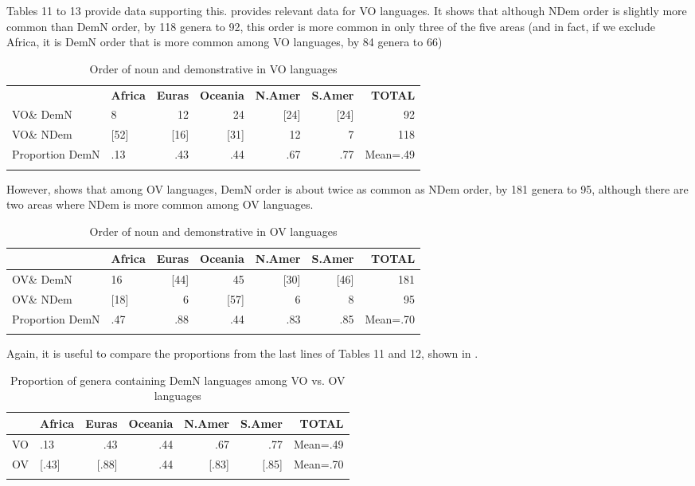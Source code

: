 \documentclass[output=paper]{langsci/langscibook}
\begin{document}
Tables 11 to 13 provide data supporting this.  provides relevant data for VO languages. It shows that although NDem order is slightly more common than DemN order, by 118 genera to 92, this order is more common in only three of the five areas (and in fact, if we exclude Africa, it is DemN order that is more common among VO languages, by 84 genera to 66)

\begin{table}
\begin{tabularx}{\textwidth}{Xlrrrrr} 
& \bfseries Africa & \bfseries Euras & \bfseries Oceania & \bfseries N.Amer & \bfseries S.Amer & \bfseries TOTAL\\
\lsptoprule
VO\& DemN & 8 & 12 & 24 & [24] & [24] & 92\\
VO\& NDem & [52] & [16] & [31] & 12 & 7 & 118\\
Proportion DemN & .13 & .43 & .44 & .67 & .77 & Mean=.49\\
\lspbottomrule
\end{tabularx}
\caption{\label{tab:dryer:11}Order of noun and demonstrative in VO languages}
\end{table}


However,  shows that among OV languages, DemN order is about twice as common as NDem order, by 181 genera to 95, although there are two areas where NDem is more common among OV languages.

\begin{table}
\begin{tabularx}{\textwidth}{Xlrrrrr}
\lsptoprule
& \bfseries Africa & \bfseries Euras & \bfseries Oceania & \bfseries N.Amer & \bfseries S.Amer & \bfseries TOTAL\\
\midrule
OV\& DemN & 16 & [44] & 45 & [30] & [46] & 181\\
OV\& NDem & [18] & 6 & [57] & 6 & 8 & 95\\
Proportion DemN & .47 & .88 & .44 & .83 & .85 & Mean=.70\\
\lspbottomrule
\end{tabularx}
\caption{\label{tab:dryer:12}Order of noun and demonstrative in OV languages}
\end{table}

Again, it is useful to compare the proportions from the last lines of Tables 11 and 12, shown in .

\begin{table}
\begin{tabularx}{\textwidth}{Xlrrrrr}
\lsptoprule
& \bfseries Africa & \bfseries Euras & \bfseries Oceania & \bfseries N.Amer & \bfseries S.Amer & \bfseries TOTAL\\
\midrule
VO & .13 & .43 & .44 & .67 & .77 & Mean=.49\\
OV & [.43] & [.88] & .44 & [.83] & [.85] & Mean=.70\\
\lspbottomrule
\end{tabularx}
\caption{\label{tab:dryer:13}Proportion of genera containing DemN languages among VO vs. OV languages}
\end{table}
\end{document}
